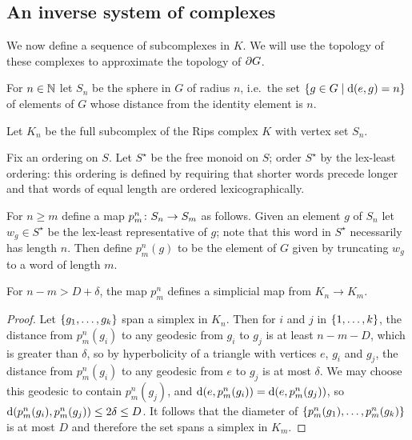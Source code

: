 \documentclass[a4paper]{article}
\begin{document}
\subsection{An inverse system of complexes}

We now define a sequence of subcomplexes in $K$. We will use the topology of
these complexes to approximate the topology of $\partial G$. 

\begin{definition}
  For $n \in \mathbb{N}$ let $S_n$ be the sphere in $G$ of radius $n$, i.e.\ the 
  set $\left\{g \in G \mid \operatorname{d}(e, g) = n\right\}$ of elements of $G$ whose 
  distance from the identity element is $n$. 

  Let $K_n$ be the full subcomplex of the Rips complex $K$ with vertex set
  $S_n$.
\end{definition}

\begin{definition}
  Fix an ordering on $S$. Let $S^\star$ be the free monoid on 
  $S$; order $S^\star$ by the lex-least ordering: this ordering is defined by 
  requiring that shorter words precede longer and that words of equal length are 
  ordered lexicographically. 

  For $n \geq m$ define a map $p^n_m \colon S_n \to S_m$ as follows.
  Given an element $g$ of $S_n$ let $w_g \in S^\star$ be the lex-least
  representative of $g$; note that this word in $S^\star$ necessarily has
  length $n$.  Then define $p^n_m(g)$ to be the element of $G$ given by
  truncating $w_g$ to a word of length $m$.
\end{definition}

\begin{lemma}\label{lem:psimplicial}
  For $n - m > D + \delta$, the map $p^n_m$ defines a simplicial map from
  $K_n \to K_m$.
\end{lemma}

\begin{proof}
  Let $\left\{g_1, \dotsc, g_k\right\}$ span a simplex in $K_n$.  Then for $i$ and
  $j$ in $\left\{1, \dotsc, k\right\}$, the distance from $p^n_m(g_i)$ to any
  geodesic from $g_i$ to $g_j$ is at least $n - m - D$, which is greater than
  $\delta$, so by hyperbolicity of a triangle with vertices $e$, $g_i$ and $g_j$,
  the distance from $p^n_m(g_i)$ to any geodesic from $e$ to $g_j$ is at most
  $\delta$. We may choose this geodesic to contain $p^n_m(g_j)$, and $\operatorname{d}(e,
  p^n_m(g_i)) = \operatorname{d}(e, p^n_m(g_j))$, so $\operatorname{d}(p^n_m(g_i), p^n_m(g_j)) \leq
  2\delta \leq D$.  It follows that the diameter of $\left\{p^n_m(g_1), \dotsc,
  p^n_m(g_k)\right\}$ is at most $D$ and therefore the set spans a simplex in $K_m$.
\end{proof}
\end{document}
